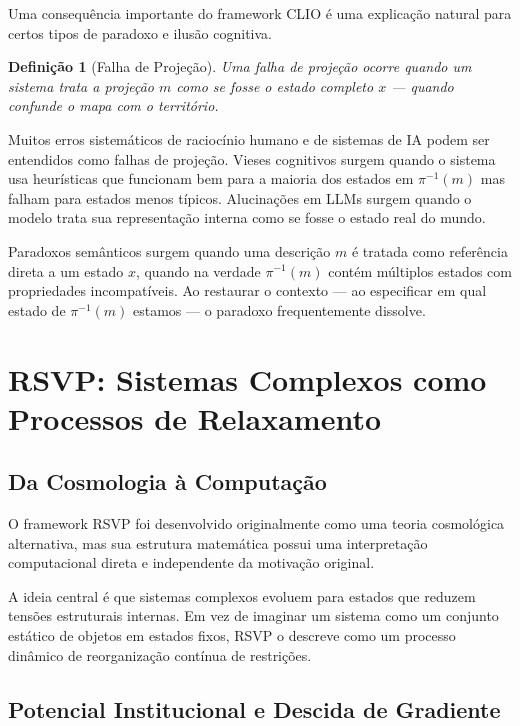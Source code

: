 \documentclass[11pt, a4paper]{article}
\theoremstyle{named}
\newtheorem{definicao}{Definição}
\begin{document}
Uma consequência importante do framework CLIO é uma explicação natural
para certos tipos de paradoxo e ilusão cognitiva.

\begin{definicao}[Falha de Projeção]
Uma falha de projeção ocorre quando um sistema trata a projeção $m$
como se fosse o estado completo $x$ — quando confunde o mapa com o
território.
\end{definicao}

Muitos erros sistemáticos de raciocínio humano e de sistemas de IA
podem ser entendidos como falhas de projeção. Vieses cognitivos surgem
quando o sistema usa heurísticas que funcionam bem para a maioria dos
estados em $\pi^{-1}(m)$ mas falham para estados menos típicos.
Alucinações em LLMs surgem quando o modelo trata sua representação
interna como se fosse o estado real do mundo.

Paradoxos semânticos surgem quando uma descrição $m$ é tratada como
referência direta a um estado $x$, quando na verdade $\pi^{-1}(m)$
contém múltiplos estados com propriedades incompatíveis. Ao restaurar
o contexto — ao especificar em qual estado de $\pi^{-1}(m)$ estamos
— o paradoxo frequentemente dissolve.

\section{RSVP: Sistemas Complexos como Processos de Relaxamento}

\subsection{Da Cosmologia à Computação}

O framework RSVP foi desenvolvido originalmente como uma teoria
cosmológica alternativa, mas sua estrutura matemática possui uma
interpretação computacional direta e independente da motivação
original.

A ideia central é que sistemas complexos evoluem para estados que
reduzem tensões estruturais internas. Em vez de imaginar um sistema
como um conjunto estático de objetos em estados fixos, RSVP o descreve
como um processo dinâmico de reorganização contínua de restrições.

\subsection{Potencial Institucional e Descida de Gradiente}
\end{document}
